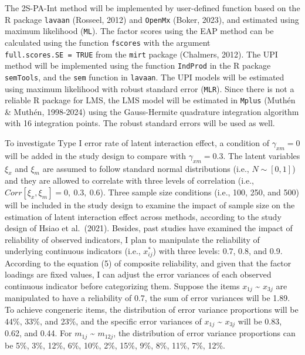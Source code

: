 \documentclass[
  man]{apa7}
\begin{document}
The 2S-PA-Int method will be implemented by user-defined function based on the R package \texttt{lavaan} (Rosseel, 2012) and \texttt{OpenMx} (Boker, 2023), and estimated using maximum likelihood (\texttt{ML}). The factor scores using the EAP method can be calculated using the function \texttt{fscores} with the argument \texttt{full.scores.SE\ =\ TRUE} from the \texttt{mirt} package (Chalmers, 2012). The UPI method will be implemented using the function \texttt{IndProd} in the R package \texttt{semTools}, and the \texttt{sem} function in \texttt{lavaan}. The UPI models will be estimated using maximum likelihood with robust standard error (\texttt{MLR}). Since there is not a reliable R package for LMS, the LMS model will be estimated in \texttt{Mplus} (Muthén \& Muthén, 1998-2024) using the Gauss-Hermite quadrature integration algorithm with 16 integration points. The robust standard errors will be used as well.

To investigate Type I error rate of latent interaction effect, a condition of \(\gamma_{xm} = 0\) will be added in the study design to compare with \(\gamma_{xm} = 0.3\). The latent variables \(\xi_{x}\) and \(\xi_{m}\) are assumed to follow standard normal distributions (i.e., \(N \sim [0,1]\)) and they are allowed to correlate with three levels of correlation (i.e., \(Corr[\xi_{x}, \xi_{m}] = 0, \ 0.3, \ 0.6\)). Three sample size conditions (i.e., 100, 250, and 500) will be included in the study design to examine the impact of sample size on the estimation of latent interaction effect across methods, according to the study design of Hsiao et al.~(2021). Besides, past studies have examined the impact of reliability of observed indicators, I plan to manipulate the reliability of underlying continuous indicators (i.e., \(x_{ij}^*\)) with three levels: 0.7, 0.8, and 0.9. According to the equation (5) of composite reliability, and given that the factor loadings are fixed values, I can adjust the error variances of each observed continuous indicator before categorizing them. Suppose the items \(x_{1j}\) \textasciitilde{} \(x_{3j}\) are manipulated to have a reliability of 0.7, the sum of error variances will be 1.89. To achieve congeneric items, the distribution of error variance proportions will be 44\%, 33\%, and 23\%, and the specific error variances of \(x_{1j}\) \textasciitilde{} \(x_{3j}\) will be 0.83, 0.62, and 0.44. For \(m_{1j}\) \textasciitilde{} \(m_{12j}\), the distribution of error variance proportions can be 5\%, 3\%, 12\%, 6\%, 10\%, 2\%, 15\%, 9\%, 8\%, 11\%, 7\%, 12\%.
\end{document}
